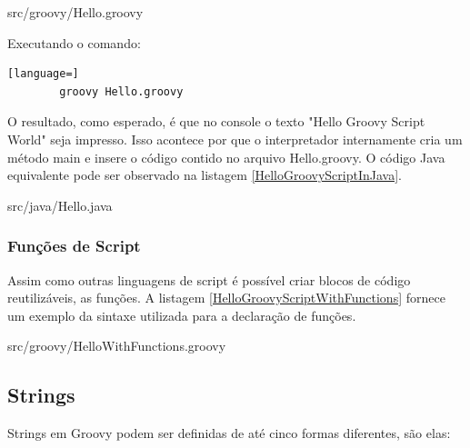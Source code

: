 \documentclass[12pt]{article}
\begin{document}
    
                    {src/groovy/Hello.groovy}

    Executando o comando:
    \begin{lstlisting}[language=]
        groovy Hello.groovy
    \end{lstlisting}
    
    O resultado, como esperado, é que no console o texto "Hello Groovy Script World"
    seja impresso. Isso acontece por que o interpretador internamente cria um 
    método main e insere o código contido no arquivo Hello.groovy. O código Java
    equivalente pode ser observado na listagem \ref{HelloGroovyScriptInJava}.
    
    
                    {src/java/Hello.java}

\subsubsection{Funções de Script}

    Assim como outras linguagens de script é possível criar blocos de código 
    reutilizáveis, as funções. A listagem \ref{HelloGroovyScriptWithFunctions} 
    fornece um exemplo da sintaxe utilizada para a declaração de funções.
    
    
                    {src/groovy/HelloWithFunctions.groovy}
   

\subsection{Strings}

    Strings em Groovy podem ser definidas de até cinco formas diferentes, são elas:
    
\end{document}
